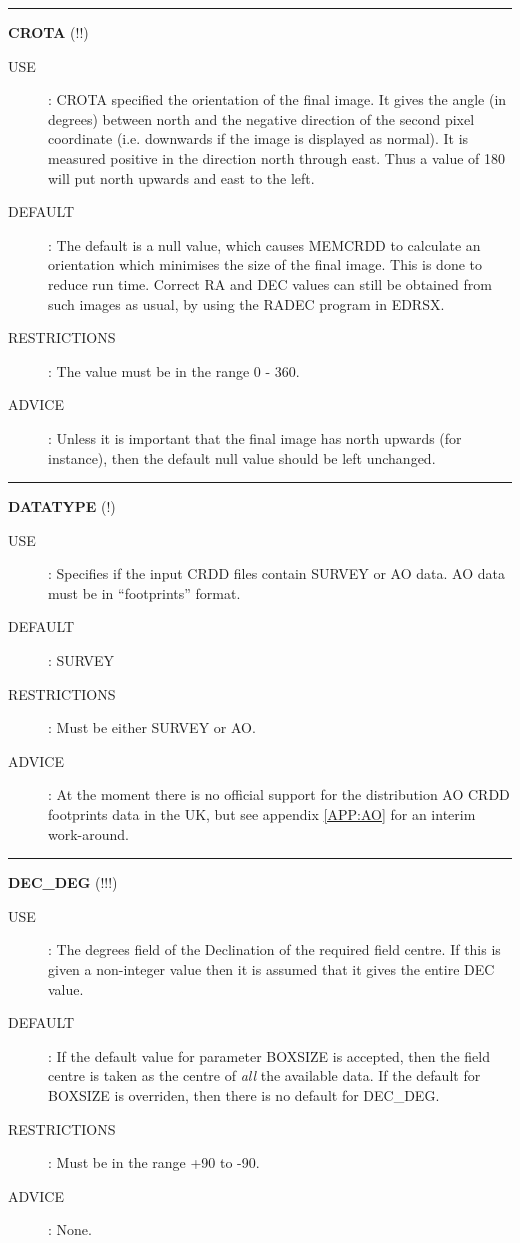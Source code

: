 \rule{\textwidth}{0.3mm}
{\Large {\bf CROTA} (!!)}
\begin{description}
\item [USE]:
CROTA specified the orientation of the final image. It gives the angle (in 
degrees) between north and the negative direction of the second pixel 
coordinate (i.e. downwards if the image is displayed as normal). It is 
measured positive in the direction north through east. Thus a value of 180 
will put north upwards and east to the left.
\item [DEFAULT]:
The default is a null value, which causes MEMCRDD to calculate an orientation 
which minimises the size of the final image. This is done to reduce run time.
Correct RA and DEC values can still be obtained from such images as usual, by 
using the RADEC program in EDRSX.
\item [RESTRICTIONS]:
The value must be in the range 0 - 360.
\item [ADVICE]:
Unless it is important that the final image has north upwards (for instance), 
then the default null value should be left unchanged.
\end {description}


\rule{\textwidth}{0.3mm}
{\Large {\bf DATATYPE} (!)}
\begin{description}
\item [USE]:
Specifies if the input CRDD files contain SURVEY or AO data. AO data must be in 
``footprints'' format.
\item [DEFAULT]:
SURVEY
\item [RESTRICTIONS]:
Must be either SURVEY or AO.
\item [ADVICE]:
At the moment there is no official support for the distribution AO CRDD 
footprints data in the UK, but see appendix \ref{APP:AO} for an interim
work-around.
\end {description}

\rule{\textwidth}{0.3mm}
{\Large {\bf DEC\_DEG} (!!!)}
\begin{description}
\item [USE]:
The degrees field of the Declination of the required field centre. If this
is given a non-integer value then it is assumed that it gives the entire DEC
value. 
\item [DEFAULT]:
If the default value for parameter BOXSIZE is accepted, then the field centre
is taken as the centre of {\em all} the available data. If the default for
BOXSIZE is overriden, then there is no default for DEC\_DEG.
\item [RESTRICTIONS]:
Must be in the range +90 to -90.
\item [ADVICE]:
None.
\end {description}

